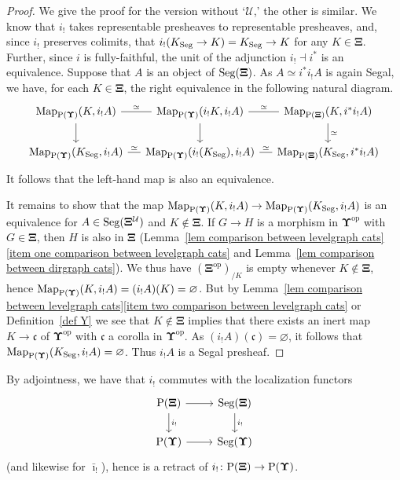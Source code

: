 \documentclass{amsart}
\numberwithin{theorem}{subsection}
\theoremstyle{definition}
\providecommand{\op}{\mathrm{op}}
\newcommand{\Map}{\operatorname{Map}}
\newcommand{\xU}{\mathcal{U}}
\newcommand{\xfc}{\mathfrak{c}}
\newcommand{\Pre}{\name{P}}
\newcommand{\name}[1]{\ensuremath{\text{\textup{#1}}}}
\newcommand{\gc}{\mathbf{\Xi}}
\newcommand{\gcone}{\gc}
\newcommand{\gctwo}{\mathbf{\Upsilon}}
\newcommand{\gcUone}{\gcone^\xU}
\newcommand{\barishriek}{\bar \imath_!}
\newcommand{\Seg}{\name{Seg}}
\begin{document}
\begin{proof}
We give the proof for the version without `$\xU$,' the other is similar.
We know that $i_!$ takes representable presheaves to representable presheaves, and, since $i_!$ preserves colimits, that $i_!(K_\Seg \to K) = K_\Seg \to K$ for any $K\in \gcone$.
Further, since $i$ is fully-faithful, the unit of the adjunction $i_! \dashv i^*$ is an equivalence.
Suppose that $A$ is an object of $\Seg(\gcone)$.
As $A \simeq i^*i_!A$ is again Segal, we have, for each $K\in \gcone$, the right equivalence in the following natural diagram.
\[ \begin{tikzcd}[column sep=small]
\Map_{\Pre(\gctwo)} (K, i_!A)\rar[no head, "\simeq"]\dar & \Map_{\Pre(\gctwo)} (i_!K, i_!A)\rar[no head, "\simeq"]\dar & \Map_{\Pre(\gcone)} (K, i^*i_!A) \dar["\simeq"] \\
\Map_{\Pre(\gctwo)} (K_\Seg, i_!A)\rar[no head, "\simeq"] & \Map_{\Pre(\gctwo)} (i_!(K_\Seg), i_!A)\rar[no head, "\simeq"] & \Map_{\Pre(\gcone)} (K_\Seg, i^*i_!A)
\end{tikzcd} \]
It follows that the left-hand map is also an equivalence.

It remains to show that the map $\Map_{\Pre(\gctwo)} (K, i_!A) \to \Map_{\Pre(\gctwo)} (K_\Seg, i_!A)$ is an equivalence for $A\in \Seg(\gcUone)$ and $K\notin \gcone$.
If $G\to H$ is a morphism in $\gctwo^\op$ with $G\in \gcone$, then $H$ is also in $\gcone$ (Lemma~\ref{lem comparison between levelgraph cats}\eqref{item one comparison between levelgraph cats} and Lemma~\ref{lem comparison between dirgraph cats}).
We thus have $(\gcone^\op)_{/K}$ is empty whenever $K\notin \gcone$, hence $\Map_{\Pre(\gctwo)} (K, i_!A)= (i_!A)(K)  =\varnothing$.
But by Lemma~\ref{lem comparison between levelgraph cats}\eqref{item two comparison between levelgraph cats} or Definition~\ref{def Y} we see that $K\notin \gcone$ implies that there exists an inert map $K\to \xfc$ of $\gctwo^\op$ with $\xfc$ a corolla in $\gctwo^\op$.
As $(i_!A)(\xfc) = \varnothing$, it follows that $\Map_{\Pre(\gctwo)} (K_\Seg, i_!A) = \varnothing$.
Thus $i_!A$ is a Segal presheaf.
\end{proof}

By adjointness, we have that $i_!$ commutes with the localization functors
\[
\begin{tikzcd}
\Pre(\gcone) \dar{i_!} \rar & \Seg(\gcone) \dar{i_!} \\
\Pre(\gctwo) \rar & \Seg(\gctwo)
\end{tikzcd} 
\]
(and likewise for $\barishriek$), hence is a retract of $i_! \colon \Pre(\gcone) \to \Pre(\gctwo)$.
\end{document}
